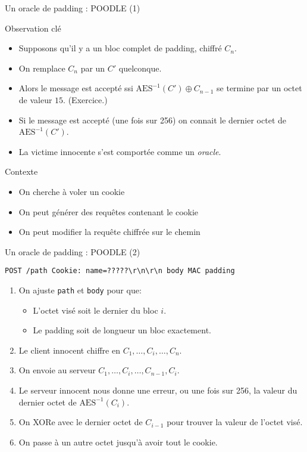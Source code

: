 \documentclass{mpg-ep-slides}
\begin{document}
\begin{frame}{Un oracle de padding : POODLE (1)}
  \begin{block}{Observation clé}
    \begin{itemize}
      \item Supposons qu'il y a un bloc complet de padding, chiffré $C_n$.
      \item On remplace $C_n$ par un $C'$ quelconque.
      \item Alors le message est accepté ssi $\text{AES}^{-1}(C') \oplus
        C_{n-1}$ se termine par un octet de valeur $15$. (Exercice.)
      \item Si le message est accepté (une fois sur 256) on connait le dernier
        octet de $\text{AES}^{-1}(C')$.
      \item La victime innocente s'est comportée comme un \emph{oracle}.
    \end{itemize}
  \end{block}

  \begin{block}{Contexte}
    \begin{itemize}
      \item On cherche à voler un cookie
      \item On peut générer des requêtes contenant le cookie
      \item On peut modifier la requête chiffrée sur le chemin
    \end{itemize}
  \end{block}
\end{frame}

\begin{frame}[containsverbatim]{Un oracle de padding : POODLE (2)}
  \begin{Verbatim}[gobble=4]
    POST /path Cookie: name=?????\r\n\r\n body MAC padding
  \end{Verbatim}
  \begin{enumerate}
    \item On ajuste \texttt{path} et \texttt{body} pour que:
      \begin{itemize}
        \item L'octet visé soit le dernier du bloc $i$.
        \item Le padding soit de longueur un bloc exactement.
      \end{itemize}
    \item Le client innocent chiffre en $C_1, \dots, C_i, \dots, C_n$.
    \item On envoie au serveur $C_1, \dots, C_i, \dots, C_{n-1}, C_i$.
    \item Le serveur innocent nous donne une erreur, ou une fois sur 256, la
      valeur du dernier octet de $\text{AES}^{-1}(C_i)$.
    \item On XORe avec le dernier octet de $C_{i-1}$ pour trouver la valeur de
      l'octet visé.
    \item On passe à un autre octet jusqu'à avoir tout le cookie.
  \end{enumerate}
\end{frame}
\end{document}
